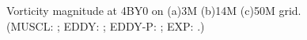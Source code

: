 \begin{figure}[t]
     \caption{Vorticity magnitude at 4BY0 on (a)3M (b)14M (c)50M grid. (MUSCL: \mline; EDDY: \eline; EDDY-P: \epline; EXP: \exact.)}
     \label{vo} 
\end{figure}
